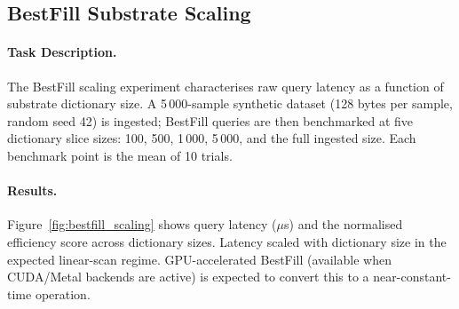 \subsection{BestFill Substrate Scaling}
\label{sec:bestfill_scaling}

\paragraph{Task Description.}
The BestFill scaling experiment characterises raw query latency as a function
of substrate dictionary size. A 5\,000-sample synthetic dataset (128 bytes
per sample, random seed 42) is ingested; BestFill queries are then benchmarked
at five dictionary slice sizes: 100, 500, 1\,000, 5\,000, and the full
ingested size. Each benchmark point is the mean of 10 trials.

\paragraph{Results.}
Figure~\ref{fig:bestfill_scaling} shows query latency ($\mu$s) and the
normalised efficiency score across dictionary sizes.
Latency scaled with dictionary size in the expected linear-scan regime.
GPU-accelerated BestFill (available when CUDA/Metal backends are active)
is expected to convert this to a near-constant-time operation.
